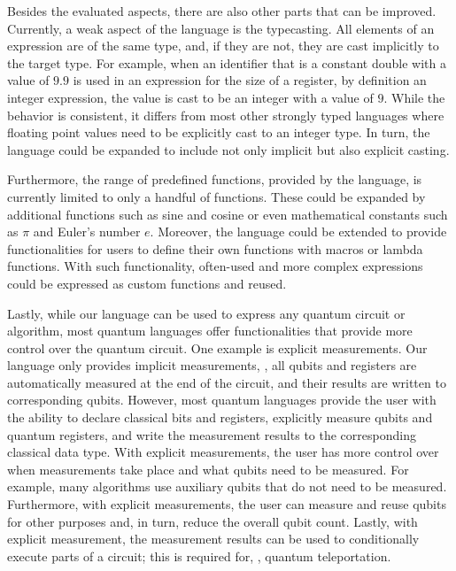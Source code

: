 Besides the evaluated aspects, there are also other parts that can be improved. Currently, a weak aspect of the language is the typecasting. All elements of an expression are of the same type, and, if they are not, they are cast implicitly to the target type. For example, when an identifier that is a constant double with a value of $9.9$ is used in an expression for the size of a register, by definition an integer expression, the value is cast to be an integer with a value of $9$. While the behavior is consistent, it differs from most other strongly typed languages where floating point values need to be explicitly cast to an integer type. In turn, the language could be expanded to include not only implicit but also explicit casting.

Furthermore, the range of predefined functions, provided by the language, is currently limited to only a handful of functions. These could be expanded by additional functions such as sine and cosine or even mathematical constants such as $\pi$ and Euler's number $e$. Moreover, the language could be extended to provide functionalities for users to define their own functions with macros or lambda functions. With such functionality, often-used and more complex expressions could be expressed as custom functions and reused.

Lastly, while our language can be used to express any quantum circuit or algorithm, most quantum languages offer functionalities that provide more control over the quantum circuit. One example is explicit measurements. Our language only provides implicit measurements, \ie, all qubits and registers are automatically measured at the end of the circuit, and their results are written to corresponding qubits. However, most quantum languages provide the user with the ability to declare classical bits and registers, explicitly measure qubits and quantum registers, and write the measurement results to the corresponding classical data type. With explicit measurements, the user has more control over when measurements take place and what qubits need to be measured. For example, many algorithms use auxiliary qubits that do not need to be measured. Furthermore, with explicit measurements, the user can measure and reuse qubits for other purposes and, in turn, reduce the overall qubit count. Lastly, with explicit measurement, the measurement results can be used to conditionally execute parts of a circuit; this is required for, \eg, quantum teleportation.